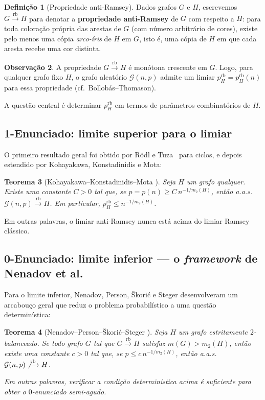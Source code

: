 \documentclass[reqno, 12pt]{amsart}
\numberwithin{equation}{section}
\theoremstyle{plain}
\newtheorem{theorem}{Teorema}[section]
\theoremstyle{definition}
\newtheorem{definition}[theorem]{Definição}
\newtheorem{remark}[theorem]{Observação}
\newcommand{\Gnp}{\mathcal{G}(n,p)}
\newcommand{\rb}{\xrightarrow{\,\mathrm{rb}\,}}
\newcommand{\mdens}{m_2}
\newcommand{\maxdens}{m}
\newcommand{\whp}{a.a.s.}
\begin{document}
\begin{definition}[Propriedade anti-Ramsey]
\label{def:antiramsey}
Dados grafos $G$ e $H$, escrevemos $G \rb H$ para denotar a
\textbf{propriedade anti-Ramsey} de $G$ com respeito a $H$:
para toda coloração própria das arestas de $G$
(com número arbitrário de cores),
existe pelo menos uma cópia \emph{arco-íris} de $H$ em $G$,
isto é, uma cópia de $H$ em que cada aresta recebe uma cor distinta.
\end{definition}

\begin{remark}
A propriedade $G \rb H$ é monótona crescente em $G$.
Logo, para qualquer grafo fixo $H$, o grafo aleatório $\Gnp$ admite
um limiar $p_H^{\mathrm{rb}} = p_H^{\mathrm{rb}}(n)$ para essa propriedade
(cf.~Bollobás--Thomason).
\end{remark}

A questão central é determinar $p_H^{\mathrm{rb}}$ em termos de parâmetros
combinatórios de $H$.

\subsection{1-Enunciado: limite superior para o limiar}

O primeiro resultado geral foi obtido por Rödl e Tuza~\cite{rodl1992rainbow}
para ciclos, e depois estendido por Kohayakawa, Konstadinidis e Mota:

\begin{theorem}[Kohayakawa--Konstadinidis--Mota \cite{kohayakawa2014anti}]
\label{thm:1statement}
Seja $H$ um grafo qualquer. Existe uma constante $C > 0$ tal que,
se $p = p(n) \ge C\, n^{-1/\mdens(H)}$, então \whp\
$\Gnp \rb H$.
Em particular, $p_H^{\mathrm{rb}} \le n^{-1/\mdens(H)}$.
\end{theorem}

Em outras palavras, o limiar anti-Ramsey nunca está acima do limiar Ramsey clássico.

\subsection{0-Enunciado: limite inferior — o \emph{framework} de Nenadov et al.}

Para o limite inferior, Nenadov, Person, Škorić e Steger desenvolveram um
arcabouço geral que reduz o problema probabilístico a uma questão determinística:

\begin{theorem}[Nenadov--Person--Škorić--Steger \cite{nenadov2017algorithmic}]
\label{thm:framework}
Seja $H$ um grafo estritamente $2$-balanceado.
Se todo grafo $G$ tal que $G \rb H$ satisfaz $\maxdens(G) > \mdens(H)$,
então existe uma constante $c > 0$ tal que, se $p \le c\, n^{-1/\mdens(H)}$,
então \whp\ $\Gnp \not\rb H$.

Em outras palavras, verificar a condição determinística acima
é suficiente para obter o $0$-enunciado semi-agudo.
\end{theorem}
\end{document}
